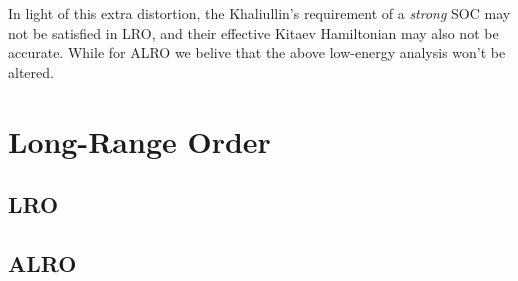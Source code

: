 \documentclass[10pt,nofootinbib,letterpaper]{revtex4}
\begin{document}
		In light of this extra distortion, the Khaliullin's requirement of a \emph{strong} SOC may not be satisfied in LRO, and their effective Kitaev Hamiltonian may also not be accurate. While for ALRO we belive that the above low-energy analysis won't be altered.\par


\section{Long-Range Order}
	\subsection{LRO}
	\subsection{ALRO}


\end{document}
